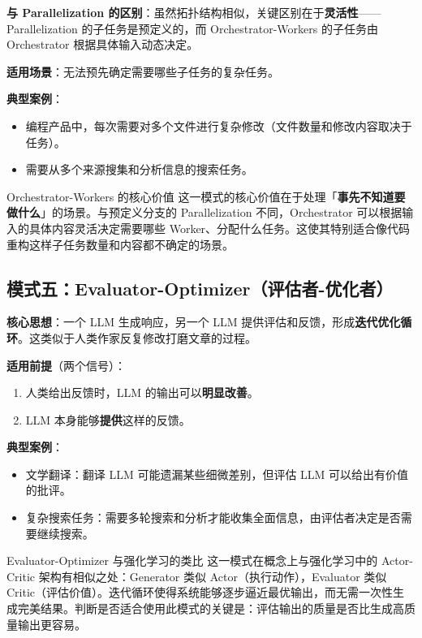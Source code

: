 \documentclass[a4paper]{article}
\begin{document}
\textbf{与 Parallelization 的区别}：虽然拓扑结构相似，关键区别在于\textbf{灵活性}——Parallelization 的子任务是预定义的，而 Orchestrator-Workers 的子任务由 Orchestrator 根据具体输入动态决定。

\textbf{适用场景}：无法预先确定需要哪些子任务的复杂任务。

\textbf{典型案例}：
\begin{itemize}
    \item 编程产品中，每次需要对多个文件进行复杂修改（文件数量和修改内容取决于任务）。
    \item 需要从多个来源搜集和分析信息的搜索任务。
\end{itemize}

\begin{importantbox}{Orchestrator-Workers 的核心价值}
这一模式的核心价值在于处理「\textbf{事先不知道要做什么}」的场景。与预定义分支的 Parallelization 不同，Orchestrator 可以根据输入的具体内容灵活决定需要哪些 Worker、分配什么任务。这使其特别适合像代码重构这样子任务数量和内容都不确定的场景。
\end{importantbox}

\subsection{模式五：Evaluator-Optimizer（评估者-优化者）}

\textbf{核心思想}：一个 LLM 生成响应，另一个 LLM 提供评估和反馈，形成\textbf{迭代优化循环}。这类似于人类作家反复修改打磨文章的过程。

\textbf{适用前提}（两个信号）：
\begin{enumerate}
    \item 人类给出反馈时，LLM 的输出可以\textbf{明显改善}。
    \item LLM 本身能够\textbf{提供}这样的反馈。
\end{enumerate}

\textbf{典型案例}：
\begin{itemize}
    \item 文学翻译：翻译 LLM 可能遗漏某些细微差别，但评估 LLM 可以给出有价值的批评。
    \item 复杂搜索任务：需要多轮搜索和分析才能收集全面信息，由评估者决定是否需要继续搜索。
\end{itemize}

\begin{knowledgebox}{Evaluator-Optimizer 与强化学习的类比}
这一模式在概念上与强化学习中的 Actor-Critic 架构有相似之处：Generator 类似 Actor（执行动作），Evaluator 类似 Critic（评估价值）。迭代循环使得系统能够逐步逼近最优输出，而无需一次性生成完美结果。判断是否适合使用此模式的关键是：评估输出的质量是否比生成高质量输出更容易。
\end{knowledgebox}
\end{document}
